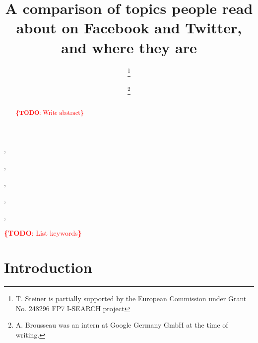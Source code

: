 \documentclass{iosart2c}
\newcommand{\todo}[1]{\noindent\textcolor{red}{{\bf \{TODO}: #1{\bf \}}}}
\begin{document}
\begin{frontmatter}

\title{A comparison of topics people read about on Facebook and Twitter, and where they are}




\author[A]{ \thanks{T. Steiner is partially supported by the European Commission under Grant No. 248296 FP7 I-SEARCH project}},
\author[B]{ },
\author[A]{ \thanks{A. Brousseau was an intern at Google Germany GmbH at the time of writing.}},
\author[C]{ },
\author[B]{ },
\author[D]{ }


\address[A]{Google Germany GmbH, ABC-Str. 19, 20354 Hamburg, Germany,\\
E-mail: tomac@google.com, arnaud.brousseau@gmail.com}
\address[B]{Ghent University -- IBBT, ELIS, Multimedia Lab, Gaston Crommenlaan 8/201, 9050 Ghent, Belgium,\\
E-mail: ruben.verborgh@ugent.be, rik.vandewalle@ugent.be}
\address[C]{EURECOM, Sophia Antipolis, France\\
E-mail: raphael.troncy@eurecom.fr}
\address[D]{Universitat Polit\`{e}cnica de Catalunya, Department LSI, 08034 Barcelona, Spain,\\
E-mail: gabarro@lsi.upc.edu}

\begin{abstract}
\todo{Write abstract}
\end{abstract}

\begin{keyword}
\todo{List keywords}
\end{keyword}

\end{frontmatter}


\section{Introduction} \label{sec:introduction}
\end{document}
